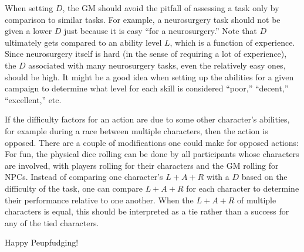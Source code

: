 When setting $D$, the GM should avoid the pitfall of assessing a task only by comparison to similar tasks.
For example, a neurosurgery task should not be given a lower $D$ just because it is easy ``for a neurosurgery.''
Note that $D$ ultimately gets compared to an ability level $L$, which is a function of experience.
Since neurosurgery itself is hard (in the sense of requiring a lot of experience), the $D$ associated with many neurosurgery tasks, even the relatively easy ones, should be high.
It might be a good idea when setting up the abilities for a given campaign to determine what level for each skill is considered ``poor,'' ``decent,'' ``excellent,'' etc.

If the difficulty factors for an action are due to some other character's abilities, for example during a race between multiple characters, then the action is opposed.
There are a couple of modifications one could make for opposed actions:
For fun, the physical dice rolling can be done by all participants whose characters are involved, with players rolling for their characters and the GM rolling for NPCs.
Instead of comparing one character’s $L + A + R$ with a $D$ based on the difficulty of the task, one can compare $L + A + R$ for each character to determine their performance relative to one another.
When the $L + A + R$ of multiple characters is equal, this should be interpreted as a tie rather than a success for any of the tied characters.

Happy Peupfudging!

